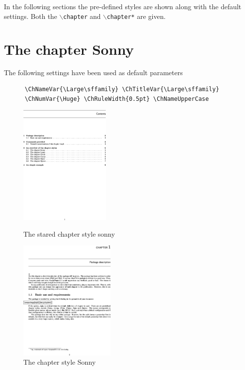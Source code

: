 \documentclass{report}
\newcommand{\A}[1]{{$\backslash$\texttt{#1}}}
\begin{document}
    In the following sections the pre-defined styles are shown along
    with the default settings. Both the \A{chapter} and \A{chapter*}
    are given.
    \section{The chapter Sonny}
    The following settings have been used as default parameters
    {\small\begin{verbatim}  
      \ChNameVar{\Large\sffamily} \ChTitleVar{\Large\sffamily}
      \ChNumVar{\Huge} \ChRuleWidth{0.5pt} \ChNameUpperCase
    \end{verbatim}}    
    \begin{figure}[h]
      \begin{minipage}{7 cm}
        \label{fig:Sonnys}
        \centerline{\includegraphics[height=6cm]{Sonnys.eps}} 
        \caption{The stared chapter style sonny}
      \end{minipage}\hfill
      \begin{minipage}{7 cm}
        \label{fig:Sonny}
        \centerline{\includegraphics[height=6cm]{Sonny.eps}}
        \caption{The chapter style Sonny}
      \end{minipage}\hfill
    \end{figure}    
    
\end{document}
